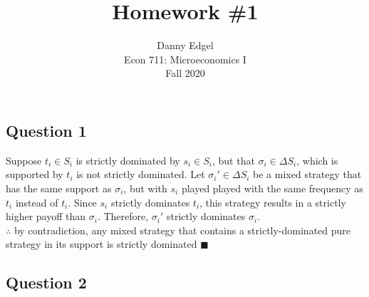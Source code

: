 \documentclass{article}
\begin{document}
\title{	Homework \#1 }
\author{ 	Danny Edgel 					\\ 
			Econ 711: Microeconomics I		\\
			Fall 2020						\\
		}
\maketitle\thispagestyle{empty}



\subsection*{Question 1}

Suppose $t_i\in S_i$ is strictly dominated by $s_i\in S_i$, but that $\sigma_i\in\Delta S_i$, which is supported by $t_i$ is not strictly dominated. Let $\sigma_i'\in\Delta S_i$ be a mixed strategy that has the same support as $\sigma_i$, but with $s_i$ played played with the same frequency as $t_i$ instead of $t_i$. Since $s_i$ strictly dominates $t_i$, this strategy results in a strictly higher payoff than $\sigma_i$. Therefore, $\sigma_i'$ strictly dominates $\sigma_i$.
\medskip \\
$\therefore$ by contradiction, any mixed strategy that contains a strictly-dominated pure strategy in its support is strictly dominated $\blacksquare$


\subsection*{Question 2}
\end{document}
